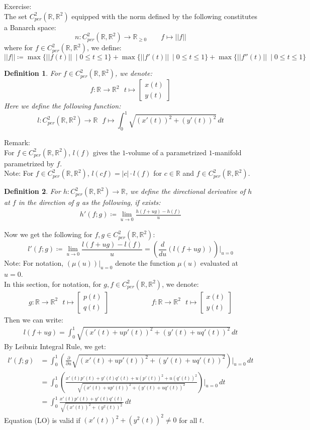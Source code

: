 \documentclass[11pt,oneside]{book}
\theoremstyle{break}
\theoremstyle{break}
\newtheorem{defn}{Definition}[corL]
\newcommand{\R}{\mathbb{R}}
\newcommand{\lr}[1]{\left(#1\right)}
\newcommand{\bmat}[1]{\begin{bmatrix} #1 \end{bmatrix}}
\newcommand{\note}{\color{red}Note: \color{black}}
\newcommand{\remark}{\color{blue}Remark: \color{black}}
\newcommand{\exercise}{\color{green}Exercise: \color{black}}
\begin{document}
\exercise\\
The set $C^2_{per}(\R, \R^2)$ equipped with the norm defined by the following constitutes a Banarch space:
$$n:C^2_{per}(\R, \R^2) \to \R_{\geq 0} \qquad f\mapsto ||f|| $$ 
where for $f \in C^2_{per}(\R, \R^2)$, we define:
$$||f|| \coloneqq \max\{||f(t)||\ \mid 0 \leq t\leq 1\} + \max\{||f'(t)||\ \mid 0 \leq t\leq 1\} + \max\{||f''(t)||\ \mid 0 \leq t\leq 1\}$$

\begin{defn}
For $f\in C^2_{per}(\R, \R^2)$, we denote: 
$$f:\R \to \R^2 \ \ \ t\mapsto \bmat{x(t)\\y(t)}$$ 
Here we define the following function:
$$l:C^2_{per}(\R, \R^2) \to \R \ \ \ f\mapsto \int_0^1 \sqrt{(x'(t))^2 + (y'(t))^2}\, dt$$ 
\end{defn}

\remark \\
For $f\in C^2_{per}(\R, \R^2)$, $l(f)$ gives the $1$-volume of a parametrized $1$-manifold parametrized by $f$. \\

\note For $f\in C^2_{per}(\R, \R^2)$, $l(cf) = |c| \cdot l(f)$ for $c \in \R$ and $f\in C^2_{per}(\R, \R^2)$. 

\begin{defn}
For $h:C^2_{per}(\R, \R^2) \to \R$, we define the directional derivative of $h$ at $f$ in the direction of $g$ as the following, if exists:
\begin{align*}
h'(f;g) \coloneqq \lim_{u \to 0}\frac{h(f+ug) - h(f)}{u}
\end{align*}
\end{defn}

Now we get the following for $f,g \in C^2_{per}(\R, \R^2)$: 
$$l'(f;g) \coloneqq \lim_{u \to 0}\frac{l(f+ug) - l(f)}{u} = \left(\frac{d}{du}(l(f+ug))\right)|_{u = 0}$$
\note For notation, $(\mu(u))|_{u=0}$ denote the function $\mu(u)$ evaluated at $u = 0$.\\

In this section, for notation, for $g,f \in C^2_{per}(\R, \R^2)$, we denote:
\begin{align*}
g:\R \to \R^2 \ \ \ t\mapsto \bmat{p(t)\\ q(t)} \qquad \qquad \qquad f:\R \to \R^2 \ \ \ t\mapsto \bmat{x(t)\\y(t)}
\end{align*}
Then we can write:
\begin{align*}
l(f+ug) = \int_0^1 \sqrt{\lr{x'(t) + up'(t)}^2 + \lr{y'(t) + uq'(t)}^2}\, dt
\end{align*}
By Leibniz Integral Rule, we get:
\begin{align*}
l'(f;g) &= \int_0^1 \left(\frac{\partial}{\partial u}\sqrt{\lr{x'(t) + up'(t)}^2 + \lr{y'(t) + uq'(t)}^2}\right)|_{u=0} \, dt   \\
&= \int_0^1 \left(\frac{x'(t)p'(t)+y'(t)q'(t)+u(p'(t))^2+u(q'(t))^2}{\sqrt{\lr{x'(t) + up'(t)}^2 + \lr{y'(t) + uq'(t)}^2}}\right)|_{u=0} \, dt \\
&= \int_0^1 \frac{x'(t)p'(t)+y'(t) q'(t)}{\sqrt{(x'(t))^2+(y^2(t))^2}}\, dt \tag{LO}
\end{align*}
Equation (LO) is valid if $(x'(t))^2+(y^2(t))^2 \neq 0$ for all $t$.
\end{document}
